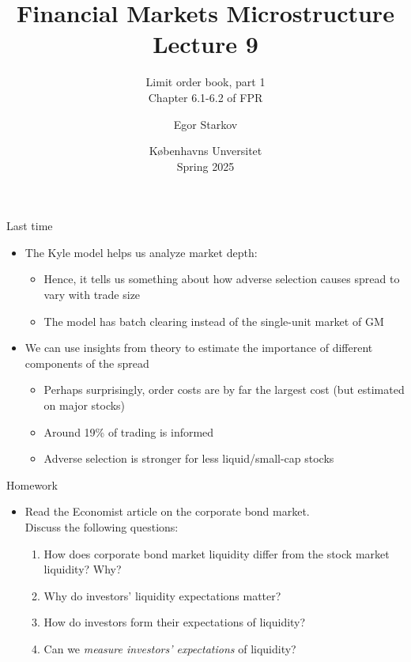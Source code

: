 \documentclass[english,10pt
,aspectratio=169
]{beamer}
\title{Financial Markets Microstructure \\ Lecture 9}
\subtitle{Limit order book, part 1\\
	Chapter 6.1-6.2 of FPR}
\author{Egor Starkov}
\date{K{\o}benhavns Unversitet \\
	Spring 2025}
\begin{document}
\frame[plain]{\titlepage}


\begin{frame}{Last time}
	\begin{itemize}
		\item The Kyle model helps us analyze market depth:
		\begin{itemize}
			\item Hence, it tells us something about how adverse selection causes spread to vary with trade size
			\item The model has batch clearing instead of the single-unit market of GM
		\end{itemize}
		\item We can use insights from theory to estimate the importance of different components of the spread
		\begin{itemize}
			\item Perhaps surprisingly, order costs are by far the largest cost (but estimated on major stocks)
			\item Around 19\% of trading is informed
			\item Adverse selection is stronger for less liquid/small-cap stocks
		\end{itemize}
	\end{itemize}
\end{frame}


\begin{frame}{Homework}
	\begin{itemize}
		\item Read the Economist article on the corporate bond market. 
		\\
		Discuss the following questions:
		\begin{enumerate}
			\item How does corporate bond market liquidity differ from the stock market liquidity? Why?
			\item Why do investors' liquidity expectations matter?
			\item How do investors form their expectations of liquidity?
			\item Can we \emph{measure investors' expectations} of liquidity?
		\end{enumerate}
	\end{itemize}
\end{frame}
\end{document}
